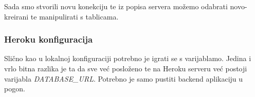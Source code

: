 		        Sada smo stvorili novu konekciju te iz popisa servera možemo odabrati novo-kreirani te manipulirati s tablicama.
		        
		
		    \subsubsection*{Heroku konfiguracija}
		        
		        Slično kao u lokalnoj konfiguraciji potrebno je igrati se s varijablamo. Jedina i vrlo bitna razlika je ta da sve već posloženo te na Heroku serveru već postoji varijabla \textit{DATABASE\_URL}. Potrebno je samo pustiti backend aplikaciju u pogon.
		    
			\eject